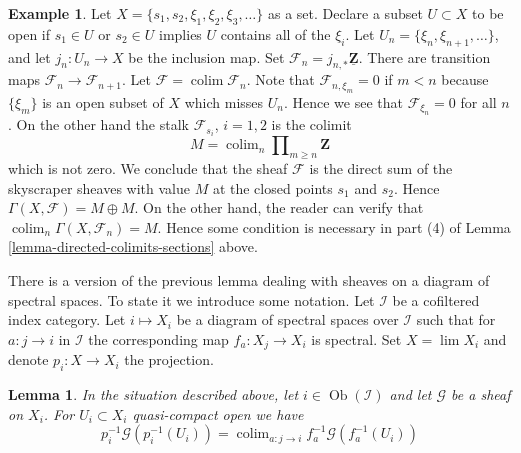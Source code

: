 \documentclass{stacks-project}
\theoremstyle{plain}
\newtheorem{lemma}[subsection]{Lemma}
\theoremstyle{definition}
\newtheorem{example}[subsection]{Example}
\theoremstyle{remark}
\numberwithin{equation}{subsection}
\def\lim{\mathop{\mathrm{lim}}\nolimits}
\def\colim{\mathop{\mathrm{colim}}\nolimits}
\def\Ob{\mathop{\mathrm{Ob}}\nolimits}
\begin{document}
\begin{example}
\label{example-conditions-needed-colimit}
Let $X = \{s_1, s_2, \xi_1, \xi_2, \xi_3, \ldots\}$ as a set.
Declare a subset $U \subset X$ to be open
if $s_1 \in U$ or $s_2 \in U$ implies $U$ contains all of the
$\xi_i$. Let $U_n = \{\xi_n, \xi_{n + 1}, \ldots\}$, and
let $j_n : U_n \to X$ be the inclusion map.
Set $\mathcal{F}_n = j_{n, *}\underline{\mathbf{Z}}$.
There are transition maps $\mathcal{F}_n \to \mathcal{F}_{n + 1}$.
Let $\mathcal{F} = \colim \mathcal{F}_n$.
Note that $\mathcal{F}_{n, \xi_m} = 0$ if $m < n$
because $\{\xi_m\}$ is an open subset of $X$ which misses $U_n$.
Hence we see that $\mathcal{F}_{\xi_n} = 0$ for all $n$.
On the other hand the stalk $\mathcal{F}_{s_i}$, $i = 1, 2$
is the colimit
$$
M = \colim_n \prod\nolimits_{m \geq n} \mathbf{Z}
$$
which is not zero. We conclude that the sheaf
$\mathcal{F}$ is the direct sum of the
skyscraper sheaves with value $M$ at the closed points
$s_1$ and $s_2$. Hence $\Gamma(X, \mathcal{F}) = M \oplus M$.
On the other hand, the reader can verify that
$\colim_n \Gamma(X, \mathcal{F}_n) = M$.
Hence some condition is necessary in part (4)
of Lemma \ref{lemma-directed-colimits-sections} above.
\end{example}

\noindent
There is a version of the previous lemma dealing with sheaves on a diagram
of spectral spaces. To state it we introduce some notation.
Let $\mathcal{I}$ be a cofiltered index category.
Let $i \mapsto X_i$ be a diagram of spectral spaces over $\mathcal{I}$
such that for $a : j \to i$ in $\mathcal{I}$ the corresponding map
$f_a : X_j \to X_i$ is spectral. Set $X = \lim X_i$ and denote
$p_i : X \to X_i$ the projection.

\begin{lemma}
\label{lemma-compute-pullback-to-limit}
In the situation described above, let $i \in \Ob(\mathcal{I})$ and let
$\mathcal{G}$ be a sheaf on $X_i$. For $U_i \subset X_i$
quasi-compact open we have
$$
p_i^{-1}\mathcal{G}(p_i^{-1}(U_i)) =
\colim_{a : j \to i} f_a^{-1}\mathcal{G}(f_a^{-1}(U_i))
$$
\end{lemma}
\end{document}
